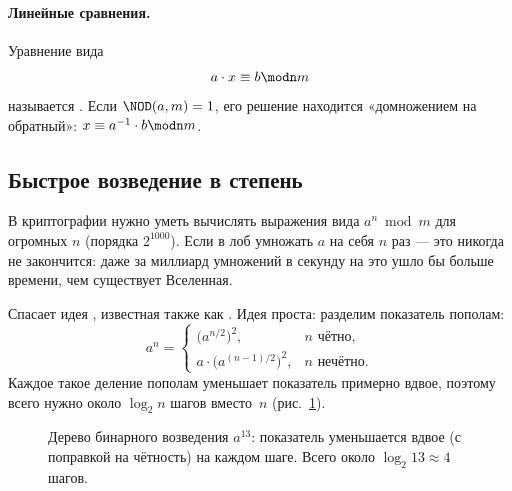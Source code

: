 \paragraph*{Линейные сравнения.} Уравнение вида
\[
a\cdot x \equiv b \modn m
\]
называется . Если $\NOD(a,m) = 1$, его решение находится «домножением на обратный»: $x \equiv a^{-1}\cdot b \modn m$.

\subsection{Быстрое возведение в степень}
\label{subsec:fastpow}

В криптографии нужно уметь вычислять выражения вида $a^n \bmod m$ для огромных $n$ (порядка $2^{1000}$). Если в лоб умножать $a$ на себя $n$ раз --- это никогда не закончится: даже за миллиард умножений в секунду на это ушло бы больше времени, чем существует Вселенная.

Спасает идея , известная также как . Идея проста: разделим показатель пополам:
\[
a^n = \begin{cases}
\bigl(a^{n/2}\bigr)^2, & n\text{ чётно},\\[2pt]
a\cdot \bigl(a^{(n-1)/2}\bigr)^2, & n\text{ нечётно}.
\end{cases}
\]
Каждое такое деление пополам уменьшает показатель примерно вдвое, поэтому всего нужно около $\log_2 n$ шагов вместо~$n$ (рис.~\ref{fig:binpow}).

\begin{figure}[H]
\centering
{}
\caption{Дерево бинарного возведения $a^{13}$: показатель уменьшается вдвое (с поправкой на чётность) на каждом шаге. Всего около $\log_2 13 \approx 4$ шагов.}
\label{fig:binpow}
\end{figure}

